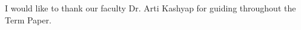 \documentclass[journal]{IEEEtran}
\begin{document}
I would like to thank our faculty Dr. Arti Kashyap for guiding throughout the Term Paper.


\ifCLASSOPTIONcaptionsoff
  \newpage
\fi







%



% 
\end{document}
